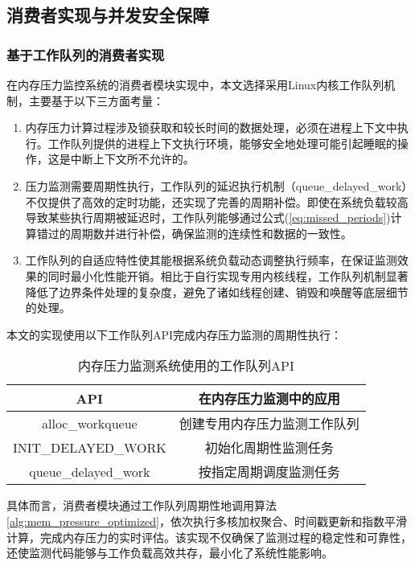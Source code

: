 \subsection{消费者实现与并发安全保障}
\label{sec:consumer_implementation}

\subsubsection{基于工作队列的消费者实现}
\label{sec:工作队列}
在内存压力监控系统的消费者模块实现中，本文选择采用Linux内核工作队列机制，主要基于以下三方面考量：
\begin{enumerate}
    \item 内存压力计算过程涉及锁获取和较长时间的数据处理，必须在进程上下文中执行。工作队列提供的进程上下文执行环境，能够安全地处理可能引起睡眠的操作，这是中断上下文所不允许的。
    \item 压力监测需要周期性执行，工作队列的延迟执行机制（queue\_delayed\_work）不仅提供了高效的定时功能，还实现了完善的周期补偿。即使在系统负载较高导致某些执行周期被延迟时，工作队列能够通过公式(\ref{eq:missed_periods})计算错过的周期数并进行补偿，确保监测的连续性和数据的一致性。
    \item 工作队列的自适应特性使其能根据系统负载动态调整执行频率，在保证监测效果的同时最小化性能开销。相比于自行实现专用内核线程，工作队列机制显著降低了边界条件处理的复杂度，避免了诸如线程创建、销毁和唤醒等底层细节的处理。
\end{enumerate}

本文的实现使用以下工作队列API完成内存压力监测的周期性执行：

\begin{table}[htbp]
\centering
\caption{内存压力监测系统使用的工作队列API}
\label{tab:workqueue_api}
\begin{tabular}{cc}
\toprule
\textbf{API} & \textbf{在内存压力监测中的应用} \\
\midrule
alloc\_workqueue & 创建专用内存压力监测工作队列 \\
INIT\_DELAYED\_WORK & 初始化周期性监测任务 \\
queue\_delayed\_work & 按指定周期调度监测任务 \\
\bottomrule
\end{tabular}
\end{table}

具体而言，消费者模块通过工作队列周期性地调用算法\ref{alg:mem_pressure_optimized}，依次执行多核加权聚合、时间戳更新和指数平滑计算，完成内存压力的实时评估。该实现不仅确保了监测过程的稳定性和可靠性，还使监测代码能够与工作负载高效共存，最小化了系统性能影响。


